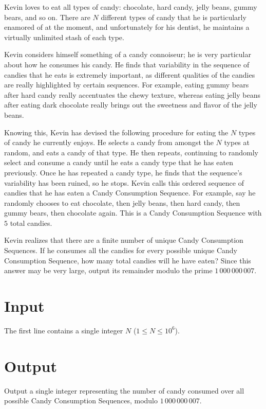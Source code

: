 
Kevin loves to eat all types of candy: chocolate, hard candy, jelly beans, gummy bears, and so on.
There are $N$ different types of candy that he is particularly enamored of at the moment, and unfortunately
for his dentist, he maintains a virtually unlimited stash of each type.

Kevin considers himself something of a candy connoiseur; he is very particular about how he consumes his
candy. He finds that variability in the sequence of candies that he eats is extremely important, as
different qualities of the candies are really highlighted by certain sequences. For example, eating gummy
bears after hard candy really accentuates the chewy texture, whereas eating jelly beans after eating dark
chocolate really brings out the sweetness and flavor of the jelly beans.

Knowing this, Kevin has devised the
following procedure for eating the $N$ types of candy he currently enjoys. He selects a candy from amongst
the $N$ types at random, and eats a candy of that type. He then repeats, continuing to randomly select and
consume a candy until he eats a candy type that he has eaten previously. Once he has repeated a candy
type, he finds that the sequence's variability has been ruined, so he stops. Kevin calls this ordered
sequence of candies that he has eaten a Candy Consumption Sequence. For example, say he randomly chooses
to eat chocolate, then jelly beans, then hard candy, then gummy bears, then chocolate again. This is a
Candy Consumption Sequence with $5$ total candies.

Kevin realizes that there are a finite number of unique Candy Consumption Sequences. If he consumes all the
candies for every possible unique Candy Consumption Sequence, how many total candies will he have eaten? 
Since this answer may be very large, output its remainder modulo the prime $1\,000\,000\,007$.

\section*{Input}
The first line contains a single integer $N$ ($1 \leq N \leq 10^6$).

\section*{Output}
Output a single integer representing the number of candy consumed over all possible Candy Consumption
Sequences, modulo $1\,000\,000\,007$.
